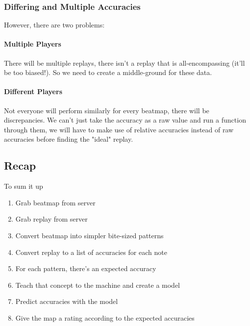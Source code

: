 \documentclass{article}
\begin{document}
\subsubsection{Differing and Multiple Accuracies}

However, there are two problems:

\paragraph{Multiple Players} There will be multiple replays, there isn't a replay that is all-encompassing (it'll be too biased!). So we need to create a middle-ground for these data.

\paragraph{Different Players} Not everyone will perform similarly for every beatmap, there will be discrepancies. We can't just take the accuracy as a raw value and run a function through them, we will have to make use of relative accuracies instead of raw accuracies before finding the "ideal" replay.

\subsection{Recap}

To sum it up

\begin{enumerate}
	\item Grab beatmap from server
	\item Grab replay from server
	\item Convert beatmap into simpler bite-sized patterns
	\item Convert replay to a list of accuracies for each note
	\item For each pattern, there's an expected accuracy
	\item Teach that concept to the machine and create a model
	\item Predict accuracies with the model
	\item Give the map a rating according to the expected accuracies
\end{enumerate}
\end{document}

